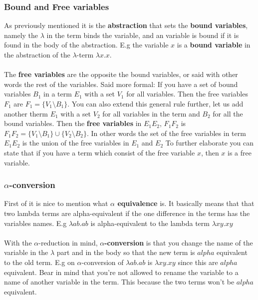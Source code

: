 \subsubsection{Bound and Free variables}
As previously mentioned it is the \textbf{abstraction} that sets the \textbf{bound variables}, namely the $\lambda$ in the term binds the variable, and an variable is bound if it is found in the body of the abstraction. E.g the variable $x$ is a \textbf{bound variable} in the abstraction of the $\lambda$-term $\lambda x.x$.\\ \\
The \textbf{free variables} are the opposite the bound variables, or said with other words the rest of the variables. Said more formal: If you have a set of bound variables $B_1$ in a term $E_1$ with a set $V_1$ for all variables.  Then the free variables $F_1$ are $F_1 = \{V_1\setminus B_1\}$. 
You can also extend this general rule further, let us add another therm $E_1$ with a set $V_2$ for all variables in the term and $B_2 $ for all the bound variables. Then the \textbf{free variables} in $E_1 E_2$, $F_1 F_2$ is $F_1 F_2 = \{V_1\setminus B_1\} \cup \{V_2\setminus B_2\}$. In other words the set of the free variables in term $E_1 E_2$ is the union of the free variables in $E_1$ and $E_2$
To further elaborate you can state that if you have a term which consist of the free variable $x$, then $x$ is a free variable.

\subsubsection{$\alpha$-conversion}

First of it is nice to mention what \textbf{$\alpha$ equivalence} is. It basically means that that two lambda terms are alpha-equivalent if the one 
difference in the terms has the variables names. E.g $\lambda ab.ab$ is alpha-equivalent to the lambda term $\lambda xy.xy$ 
\\ \\
With the $\alpha$-reduction in mind, \textbf{$\alpha$-conversion} is that you change the name of the variable in the $\lambda$ part 
and in the body so that the new term is $alpha$ equivalent to the old term. E.g on $\alpha$-conversion of $\lambda ab.ab$ is $\lambda xy.xy$ 
since this are $alpha$ equivalent. Bear in mind that you're not allowed to rename the variable to a name of another variable in the term. 
This because the two terms won't be $alpha$ equivalent.

